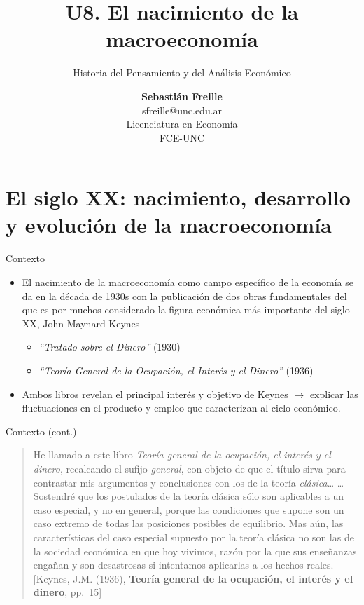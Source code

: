 \documentclass[
  ignorenonframetext,
]{beamer}
\title{U8. El nacimiento de la macroeconomía}
\subtitle{Historia del Pensamiento y del Análisis Económico}
\author{\textbf{Sebastián Freille}\\
sfreille@unc.edu.ar\\
Licenciatura en Economía\\
FCE-UNC}
\date{}
\providecommand{\tightlist}{%
  \setlength{\itemsep}{0pt}\setlength{\parskip}{0pt}}\usepackage{longtable,booktabs,array}
\begin{document}
\frame{\titlepage}
\ifdefined\Shaded\renewenvironment{Shaded}{\begin{tcolorbox}[sharp corners, interior hidden, borderline west={3pt}{0pt}{shadecolor}, enhanced, breakable, frame hidden, boxrule=0pt]}{\end{tcolorbox}}\fi

\hypertarget{el-siglo-xx-nacimiento-desarrollo-y-evoluciuxf3n-de-la-macroeconomuxeda}{%
\section{El siglo XX: nacimiento, desarrollo y evolución de la
macroeconomía}\label{el-siglo-xx-nacimiento-desarrollo-y-evoluciuxf3n-de-la-macroeconomuxeda}}

\begin{frame}{Contexto}
\protect\hypertarget{contexto}{}
\begin{itemize}
\tightlist
\item
  El nacimiento de la macroeconomía como campo específico de la economía
  se da en la década de 1930s con la publicación de dos obras
  fundamentales del que es por muchos considerado la figura económica
  más importante del siglo XX, John Maynard Keynes

  \begin{itemize}
  \tightlist
  \item
    \emph{``Tratado sobre el Dinero''} (1930)
  \item
    \emph{``Teoría General de la Ocupación, el Interés y el Dinero''}
    (1936)
  \end{itemize}
\item
  Ambos libros revelan el principal interés y objetivo de Keynes
  \(\longrightarrow\) explicar las fluctuaciones en el producto y empleo
  que caracterizan al ciclo económico.
\end{itemize}
\end{frame}

\begin{frame}{Contexto (cont.)}
\protect\hypertarget{contexto-cont.}{}
\begin{quote}
He llamado a este libro \emph{Teoría general de la ocupación, el interés
y el dinero}, recalcando el sufijo \emph{general}, con objeto de que el
título sirva para contrastar mis argumentos y conclusiones con los de la
teoría \emph{clásica}\ldots{} \ldots Sostendré que los postulados de la
teoría clásica sólo son aplicables a un caso especial, y no en general,
porque las condiciones que supone son un caso extremo de todas las
posiciones posibles de equilibrio. Mas aún, las características del caso
especial supuesto por la teoría clásica no son las de la sociedad
económica en que hoy vivimos, razón por la que sus enseñanzas engañan y
son desastrosas si intentamos aplicarlas a los hechos reales. {[}Keynes,
J.M. (1936), \textbf{Teoría general de la ocupación, el interés y el
dinero}, pp.~15{]}
\end{quote}
\end{frame}
\end{document}
